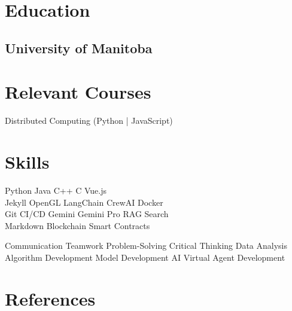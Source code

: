  

\begin{minipage}[t]{0.36\textwidth}
    \section{Education} 
      \subsection{University of Manitoba}
    \sectionsep

    \section{Relevant Courses} 
      Distributed Computing (Python | JavaScript) \\
    \sectionsep

    \section{Skills} 
      Python \textbullet{} Java \textbullet{} C++ \textbullet{} C \textbullet{} Vue.js \\
      Jekyll \textbullet{} OpenGL \textbullet{} LangChain \textbullet{} CrewAI \textbullet{} Docker\\
      Git \textbullet{} CI/CD \textbullet{} Gemini \textbullet{} Gemini Pro \textbullet{} RAG Search\\
      Markdown \textbullet{} Blockchain \textbullet{} Smart Contracts
    \skillsVSpace

      Communication \textbullet{} Teamwork \textbullet{} Problem-Solving \textbullet{} Critical Thinking \textbullet{} Data Analysis \\
      Algorithm Development \textbullet{} Model Development \textbullet{} AI Virtual Agent Development
    \skillsVSpace
    \sectionsep

    \section{References} 

\end{minipage}
